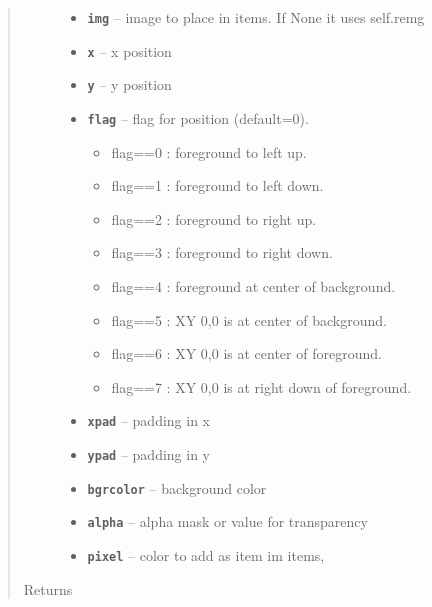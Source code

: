 \documentclass[letterpaper,10pt,english]{sphinxmanual}
\begin{document}
\begin{fulllineitems}
\begin{fulllineitems}
\begin{quote}
\begin{description}
\begin{itemize}
\item {} 
\textbf{\texttt{img}} -- image to place in items. If None it uses self.remg

\item {} 
\textbf{\texttt{x}} -- x position

\item {} 
\textbf{\texttt{y}} -- y position

\item {} 
\textbf{\texttt{flag}} -- 
flag for position (default=0).
\begin{itemize}
\item {} 
flag==0 : foreground to left up.

\item {} 
flag==1 : foreground to left down.

\item {} 
flag==2 : foreground to right up.

\item {} 
flag==3 : foreground to right down.

\item {} 
flag==4 : foreground at center of background.

\item {} 
flag==5 : XY 0,0 is at center of background.

\item {} 
flag==6 : XY 0,0 is at center of foreground.

\item {} 
flag==7 : XY 0,0 is at right down of foreground.

\end{itemize}


\item {} 
\textbf{\texttt{xpad}} -- padding in x

\item {} 
\textbf{\texttt{ypad}} -- padding in y

\item {} 
\textbf{\texttt{bgrcolor}} -- background color

\item {} 
\textbf{\texttt{alpha}} -- alpha mask or value for transparency

\item {} 
\textbf{\texttt{pixel}} -- color to add as item im items,

\end{itemize}

\item[{Returns}] \leavevmode



\end{description}
\end{quote}
\end{fulllineitems}
\end{fulllineitems}
\end{document}
